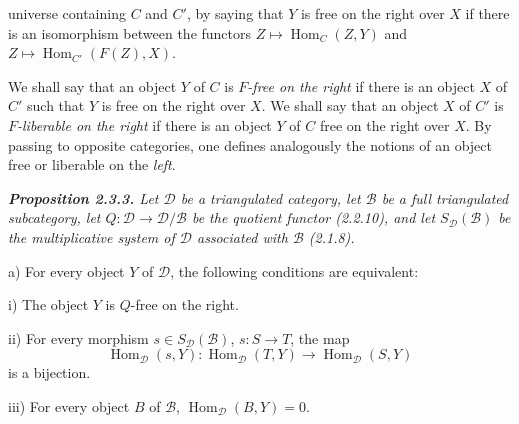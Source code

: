 \clearpage
{}%
\begingroup
\small
\setlength{\parskip}{0pt}%
\setlength{\emergencystretch}{1.5em}%
\setlength{\abovedisplayskip}{3pt plus 1pt minus 1pt}%
\setlength{\belowdisplayskip}{3pt plus 1pt minus 1pt}%

\noindent universe containing $C$ and $C'$, by saying that $Y$ is free on
the right over $X$ if there is an isomorphism between the functors
$Z\longmapsto\operatorname{Hom}_C(Z,Y)$ and
$Z\longmapsto\operatorname{Hom}_{C'}(F(Z),X)$.

We shall say that an object $Y$ of $C$ is \emph{$F$-free on the right} if
there is an object $X$ of $C'$ such that $Y$ is free on the right over
$X$. We shall say that an object $X$ of $C'$ is \emph{$F$-liberable on the
right} if there is an object $Y$ of $C$ free on the right over $X$. By
passing to opposite categories, one defines analogously the notions of an
object free or liberable on the \emph{left}.

\medskip
\begingroup\itshape
\noindent\textbf{Proposition 2.3.3.}\quad
Let $\mathcal D$ be a triangulated category, let $\mathcal B$ be a full
triangulated subcategory, let
$Q\colon\mathcal D\longrightarrow\mathcal D/\mathcal B$ be the quotient
functor (2.2.10), and let $S_{\mathcal D}(\mathcal B)$ be the
multiplicative system of $\mathcal D$ associated with $\mathcal B$ (2.1.8).

\par\noindent a) For every object $Y$ of $\mathcal D$, the following
conditions are equivalent:

\par\noindent\hspace{1.2em}i) The object $Y$ is $Q$-free on the right.

\par\noindent\hspace{1.2em}ii) For every morphism
$s\in S_{\mathcal D}(\mathcal B)$, $s\colon S\longrightarrow T$, the map
\[
  \operatorname{Hom}_{\mathcal D}(s,Y)\colon
  \operatorname{Hom}_{\mathcal D}(T,Y)\longrightarrow
  \operatorname{Hom}_{\mathcal D}(S,Y)
\]
is a bijection.

\par\noindent\hspace{1.2em}iii) For every object $B$ of $\mathcal B$,
$\operatorname{Hom}_{\mathcal D}(B,Y)=0$.

